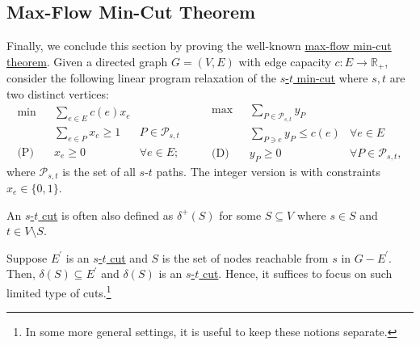 \subsection{Max-Flow Min-Cut Theorem}
Finally, we conclude this section by proving the well-known \hyperref[thm:max-flow-min-cut]{max-flow min-cut theorem}. Given a directed graph \(G= (V, E)\) with edge capacity \(c \colon E \to \mathbb{R} _+\), consider the following linear program relaxation of the \hyperref[prb:s-t-min-cut]{\(s\)-\(t\) min-cut} where \(s, t\) are two distinct vertices:
\begin{equation}\label{eq:s-t-min-cut-LP}
	\begin{aligned}
		\min~           & \sum_{e \in E} c(e) x_e                              \\
		                & \sum_{e \in P} x_e \geq 1 & P \in \mathcal{P}_{s, t} \\
		\text{(P)}\quad & x_e \geq 0                & \forall e \in E;
	\end{aligned}\qquad
	\begin{aligned}
		\max~           & \sum_{P \in \mathcal{P}_{s, t}} y_P                                     \\
		                & \sum_{P \ni e} y_P \leq c(e)        & \forall e \in E                   \\
		\text{(D)}\quad & y_P \geq 0                          & \forall P \in \mathcal{P}_{s, t},
	\end{aligned}
\end{equation}
where \(\mathcal{P} _{s, t}\) is the set of all \(s\)-\(t\) paths. The integer version is with constraints \(x_e \in \{ 0, 1 \} \).

\begin{remark}
	An \hyperref[prb:s-t-min-cut]{\(s\)-\(t\) cut} is often also defined as \(\delta ^+(S)\) for some \(S \subseteq V\) where \(s \in S\) and \(t \in V \setminus S\).
\end{remark}
\begin{explanation}
	Suppose \(E^{\prime} \) is an \hyperref[prb:s-t-min-cut]{\(s\)-\(t\) cut} and \(S\) is the set of nodes reachable from \(s\) in \(G - E^{\prime} \). Then, \(\delta (S) \subseteq E^{\prime} \) and \(\delta (S)\) is an \hyperref[prb:s-t-min-cut]{\(s\)-\(t\) cut}. Hence, it suffices to focus on such limited type of cuts.\footnote{In some more general settings, it is useful to keep these notions separate.}
\end{explanation}

